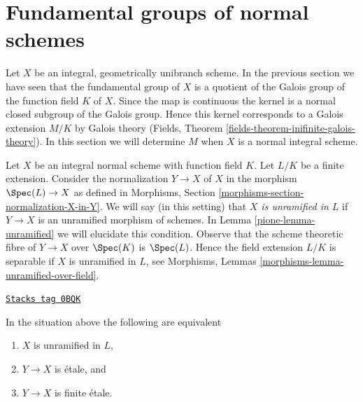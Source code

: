 \section{Fundamental groups of normal schemes}
\label{pione-section-normal}
Let $X$ be an integral, geometrically unibranch scheme. In the previous section
we have seen that the fundamental group of $X$ is a quotient of the
Galois group of the function field $K$ of $X$. Since the map is continuous
the kernel is a normal closed subgroup of the Galois group. Hence this kernel
corresponds to a Galois extension $M/K$ by Galois theory
(Fields, Theorem \ref{fields-theorem-inifinite-galois-theory}).
In this section we will determine $M$ when $X$ is a normal integral scheme.

\medskip\noindent
Let $X$ be an integral normal scheme with function field $K$.
Let $L/K$ be a finite extension. Consider the normalization
$Y \to X$ of $X$ in the morphism $\Spec(L) \to X$ as defined in
Morphisms, Section \ref{morphisms-section-normalization-X-in-Y}.
We will say (in this setting) that {\it $X$ is unramified in $L$}
if $Y \to X$ is an unramified morphism of schemes. In
Lemma \ref{pione-lemma-unramified} we will elucidate this condition.
Observe that the scheme theoretic fibre of $Y \to X$ over $\Spec(K)$
is $\Spec(L)$. Hence the field extension $L/K$ is separable if $X$ is
unramified in $L$, see
Morphisms, Lemmas \ref{morphisms-lemma-unramified-over-field}.

\begin{lemma}[Unramified in L]
\label{pione-lemma-unramified-in-L}
\href{https://stacks.math.columbia.edu/tag/0BQK}{\texttt{Stacks tag 0BQK}}

In the situation above the following are equivalent
\begin{enumerate}
\item $X$ is unramified in $L$,
\item $Y \to X$ is \'etale, and
\item $Y \to X$ is finite \'etale.
\end{enumerate}
\end{lemma}

